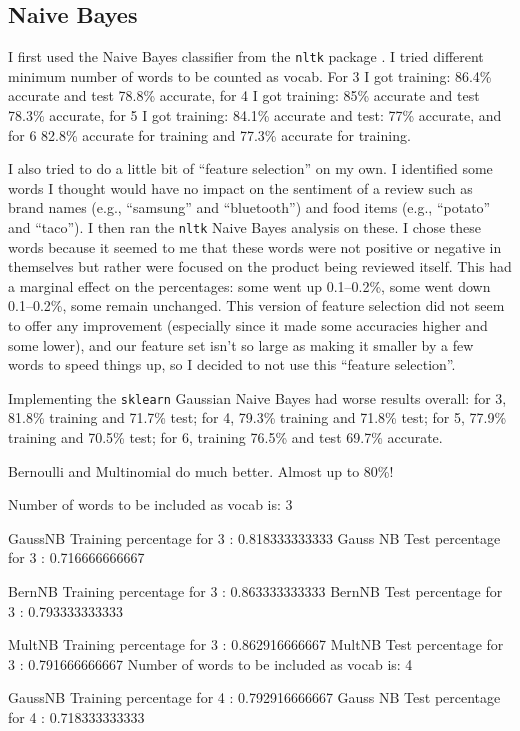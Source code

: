 \subsection{Naive Bayes}
I first used the Naive Bayes classifier from the \texttt{nltk} package \cite{bird2009}.  I tried different minimum number of words to be counted as vocab.  For 3 I got training: 86.4\% accurate and test 78.8\% accurate, for 4 I got training: 85\% accurate and test 78.3\% accurate, for 5 I got training: 84.1\% accurate and test: 77\% accurate, and for 6 82.8\% accurate for training and 77.3\% accurate for training.

I also tried to do a little bit of ``feature selection'' on my own.  I identified some words I thought would have no impact on the sentiment of a review such as brand names (e.g., ``samsung'' and ``bluetooth'') and food items (e.g., ``potato'' and ``taco'').  I then ran the \texttt{nltk} Naive Bayes analysis on these.  I chose these words because it seemed to me that these words were not positive or negative in themselves but rather were focused on the product being reviewed itself.  This had a marginal effect on the percentages: some went up 0.1--0.2\%, some went down 0.1--0.2\%, some remain unchanged.  This version of feature selection did not seem to offer any improvement (especially since it made some accuracies higher and some lower), and our feature set isn't so large as making it smaller by a few words to speed things up, so I decided to not use this ``feature selection''.

Implementing the \texttt{sklearn} \cite{zhu2009} Gaussian Naive Bayes had worse results overall: for 3, 81.8\% training and 71.7\% test; for 4, 79.3\% training and 71.8\% test; for 5, 77.9\% training and 70.5\% test; for 6, training 76.5\% and test 69.7\% accurate.

Bernoulli and Multinomial do much better.  Almost up to 80\%!

Number of words to be included as vocab is: 3

GaussNB Training percentage for 3 : 0.818333333333
Gauss NB Test percentage for 3 :     0.716666666667

BernNB Training percentage for 3 : 0.863333333333
BernNB Test percentage for 3 :     0.793333333333

MultNB Training percentage for 3 : 0.862916666667
MultNB Test percentage for 3 :     0.791666666667
Number of words to be included as vocab is: 4

GaussNB Training percentage for 4 : 0.792916666667
Gauss NB Test percentage for 4 :     0.718333333333

